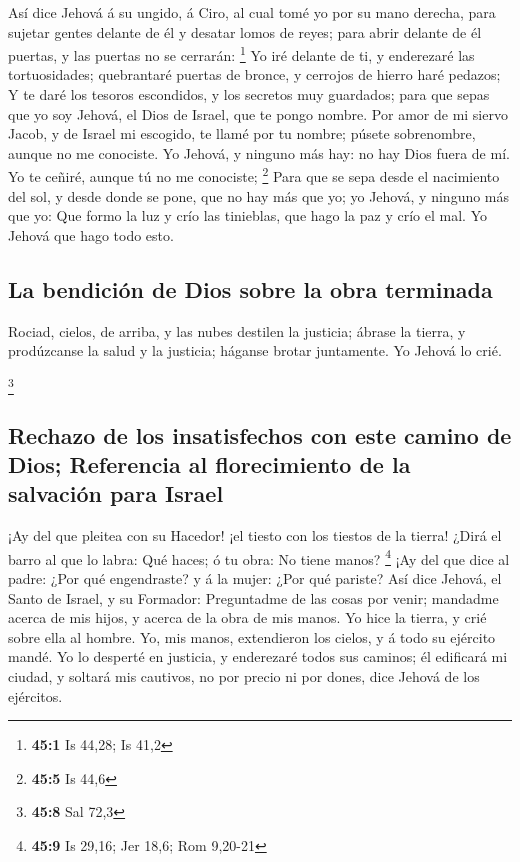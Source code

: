  Así dice Jehová á su ungido, á Ciro, al cual tomé yo por
su mano derecha, para sujetar gentes delante de él y desatar lomos de
reyes; para abrir delante de él puertas, y las puertas no se cerrarán:
\footnote{\textbf{45:1} Is 44,28; Is 41,2}  Yo iré delante
de ti, y enderezaré las tortuosidades; quebrantaré puertas de bronce, y
cerrojos de hierro haré pedazos;  Y te daré los tesoros
escondidos, y los secretos muy guardados; para que sepas que yo soy
Jehová, el Dios de Israel, que te pongo nombre.  Por amor
de mi siervo Jacob, y de Israel mi escogido, te llamé por tu nombre;
púsete sobrenombre, aunque no me conociste.  Yo Jehová, y
ninguno más hay: no hay Dios fuera de mí. Yo te ceñiré, aunque tú no me
conociste; \footnote{\textbf{45:5} Is 44,6}  Para que se
sepa desde el nacimiento del sol, y desde donde se pone, que no hay más
que yo; yo Jehová, y ninguno más que yo:  Que formo la luz
y crío las tinieblas, que hago la paz y crío el mal. Yo Jehová que hago
todo esto.

\hypertarget{la-bendiciuxf3n-de-dios-sobre-la-obra-terminada}{%
\subsection{La bendición de Dios sobre la obra
terminada}\label{la-bendiciuxf3n-de-dios-sobre-la-obra-terminada}}

 Rociad, cielos, de arriba, y las nubes destilen la
justicia; ábrase la tierra, y prodúzcanse la salud y la justicia;
háganse brotar juntamente. Yo Jehová lo crié.

\footnote{\textbf{45:8} Sal 72,3}

\hypertarget{rechazo-de-los-insatisfechos-con-este-camino-de-dios-referencia-al-florecimiento-de-la-salvaciuxf3n-para-israel}{%
\subsection{Rechazo de los insatisfechos con este camino de Dios;
Referencia al florecimiento de la salvación para
Israel}\label{rechazo-de-los-insatisfechos-con-este-camino-de-dios-referencia-al-florecimiento-de-la-salvaciuxf3n-para-israel}}

 ¡Ay del que pleitea con su Hacedor! ¡el tiesto con los
tiestos de la tierra! ¿Dirá el barro al que lo labra: Qué haces; ó tu
obra: No tiene manos? \footnote{\textbf{45:9} Is 29,16; Jer 18,6; Rom
  9,20-21}  ¡Ay del que dice al padre: ¿Por qué
engendraste? y á la mujer: ¿Por qué pariste?  Así dice
Jehová, el Santo de Israel, y su Formador: Preguntadme de las cosas por
venir; mandadme acerca de mis hijos, y acerca de la obra de mis manos.
 Yo hice la tierra, y crié sobre ella al hombre. Yo, mis
manos, extendieron los cielos, y á todo su ejército mandé.
 Yo lo desperté en justicia, y enderezaré todos sus
caminos; él edificará mi ciudad, y soltará mis cautivos, no por precio
ni por dones, dice Jehová de los ejércitos.

